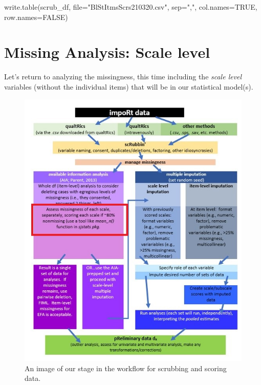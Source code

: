 \documentclass[
  english,
]{book}
\newenvironment{Shaded}{\begin{snugshade}}{\end{snugshade}}
\newcommand{\AttributeTok}[1]{\textcolor[rgb]{0.77,0.63,0.00}{#1}}
\newcommand{\ConstantTok}[1]{\textcolor[rgb]{0.00,0.00,0.00}{#1}}
\newcommand{\FunctionTok}[1]{\textcolor[rgb]{0.00,0.00,0.00}{#1}}
\newcommand{\NormalTok}[1]{#1}
\newcommand{\StringTok}[1]{\textcolor[rgb]{0.31,0.60,0.02}{#1}}
\begin{document}
\begin{Shaded}
\begin{Highlighting}[]
\FunctionTok{write.table}\NormalTok{(scrub\_df, }\AttributeTok{file=}\StringTok{"BlStItmsScrs210320.csv"}\NormalTok{, }\AttributeTok{sep=}\StringTok{","}\NormalTok{, }\AttributeTok{col.names=}\ConstantTok{TRUE}\NormalTok{, }\AttributeTok{row.names=}\ConstantTok{FALSE}\NormalTok{)}
\end{Highlighting}
\end{Shaded}

\hypertarget{missing-analysis-scale-level}{%
\section{Missing Analysis: Scale level}\label{missing-analysis-scale-level}}

Let's return to analyzing the missingness, this time including the \emph{scale level} variables (without the individual items) that will be in our statistical model(s).

\begin{figure}
\centering
\includegraphics{images/Ch02/wrkflow_scale_lvl.jpg}
\caption{An image of our stage in the workflow for scrubbing and scoring data.}
\end{figure}
\end{document}
